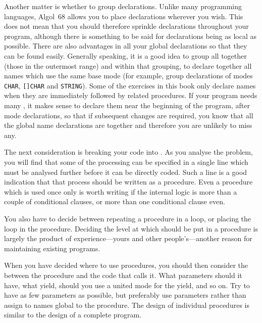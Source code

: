Another matter is whether to group declarations. Unlike many
programming languages, Algol~68 allows you to place declarations
wherever you wish. This does not mean that you should therefore
sprinkle declarations throughout your program, although there is
something to be said for declarations being as local as possible.
There are also advantages in 
all your global declarations so that they can be found easily.
Generally speaking, it is a good idea to group all 
together (those in the outermost range) and within that grouping, to
declare together all names which use the same base mode (for example,
group declarations of modes \verb|CHAR|, \verb|[]CHAR| and
\verb|STRING|).  Some of the exercises in this book only declare
names when they are immediately followed by related procedures. If
your program needs many , it makes
sense to declare them near the beginning of the program, after mode
declarations, so that if subsequent changes are required, you know
that all the global name declarations are together and therefore you
are unlikely to miss any.

The next consideration is breaking your code into
.
As you analyse the problem, you will find that some of the processing
can be specified in a single line which must be analysed further
before it can be directly coded.  Such a line is a good indication
that that process should be written as a procedure.  Even a procedure
which is used once only is worth writing if the internal logic is
more than a couple of conditional clauses, or more than one
conditional clause even.

You also have to decide between repeating a procedure in a loop, or
placing the loop in the procedure.  Deciding the level at which
 should be put in a procedure is largely the
product of experience---yours and other people's---another reason for
maintaining existing programs.

When you have decided where to use procedures, you should then consider
the  between the procedure and the
code that calls it.  What parameters should it have, what yield, should
you use a united mode for the yield, and so on.  Try to have as few
parameters as possible, but preferably use parameters rather than
assign to names global to the procedure.  The design of individual
procedures is similar to the design of a complete program.

